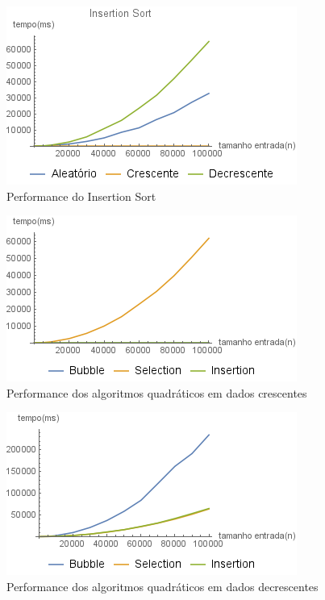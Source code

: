 \documentclass[a4paper, 12pt]{report}
\begin{document}
\begin{figure}[htb]
\centering
\includegraphics[width=.9\linewidth]{./img/insertion_all.png}
\caption{Performance do Insertion Sort}
\end{figure}

\begin{figure}[htb]
\centering
\includegraphics[width=.9\linewidth]{./img/quadratic_crescent.png}
\caption{\small Performance dos algoritmos quadráticos em dados crescentes}
\end{figure}

\begin{figure}[htb]
\centering
\includegraphics[width=.9\linewidth]{./img/quadratic_decrescent.png}
\caption{\small Performance dos algoritmos quadráticos em dados decrescentes}
\end{figure}
\end{document}
